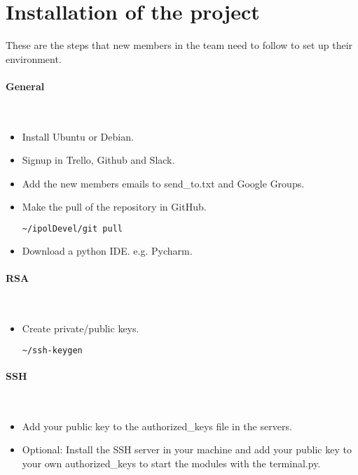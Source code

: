 \section{Installation of the project}


These are the steps that new members in the team need to follow to set up their environment.

\paragraph{General} \hspace{0pt} \\
\begin{itemize}
 \item Install Ubuntu or Debian.
 \item Signup in Trello, Github and Slack.
 \item Add the new members emails to send\_to.txt  and Google Groups.
 \item Make the pull of the repository in GitHub.
  \begin{lstlisting}[language=Bash]
  ~/ipolDevel/git pull
  \end{lstlisting}
 \item Download a python IDE. e.g. Pycharm.
\end{itemize}

\paragraph{RSA} \hspace{0pt} \\
\begin{itemize}
 \item Create private/public keys.
  \begin{lstlisting}[language=Bash]
  ~/ssh-keygen
  \end{lstlisting}
\end{itemize}

\paragraph{SSH} \hspace{0pt} \\
\begin{itemize}
 \item Add your public key to the authorized\_keys file in the servers.
 \item Optional: Install the SSH server in your machine and add your public key to your own authorized\_keys to start the modules with the terminal.py.
\end{itemize}

